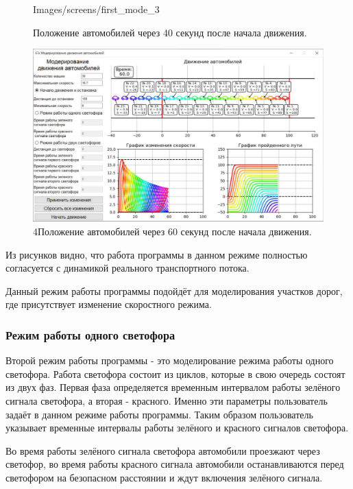 \documentclass[12pt, a4paper]{extarticle}
\numberwithin{equation}{section}
\numberwithin{figure}{section}
\begin{document}
\begin{figure}[h!]
\begin{center}
\begin{minipage}[h]{0.48\linewidth}
			{Images/screens/first_mode_3}
			\caption{Положение автомобилей через 40 секунд после начала движения.}
			\label{first_mode_3}
		\end{minipage}
			\hfill 
		\begin{minipage}[h]{0.48\linewidth}
			\includegraphics[width=1\linewidth]
			{Images/screens/first_mode_4}
			\caption{4Положение автомобилей через 60 секунд после начала движения.}
			\label{first_mode_4}
		\end{minipage}
	\end{center}
\end{figure}

Из рисунков видно, что работа программы в данном режиме полностью согласуется с динамикой реального транспортного потока.

Данный режим работы программы подойдёт для моделирования участков дорог, где присутствует изменение скоростного режима.

\subsubsection{Режим работы одного светофора}

Второй режим работы программы - это моделирование режима работы одного светофора. Работа светофора состоит из циклов, которые в свою очередь состоят из двух фаз. Первая фаза определяется временным интервалом работы зелёного сигнала светофора, а вторая - красного. Именно эти параметры пользователь задаёт в данном режиме работы программы. Таким образом пользователь указывает временные интервалы работы зелёного и красного сигналов светофора. 

Во время работы зелёного сигнала светофора автомобили проезжают через светофор, во время работы красного сигнала автомобили останавливаются перед светофором на безопасном расстоянии и ждут включения зелёного сигнала. 
\end{document}
